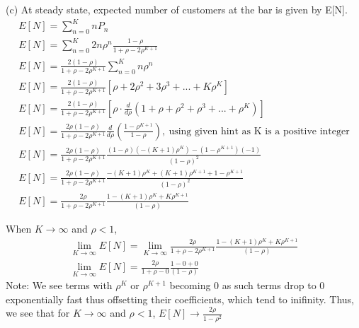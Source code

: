(c) At steady state, expected number of customers at the bar is given by E[N].
\begin{gather*}
E[N] = \sum_{n=0}^{K}nP_n\\
E[N] = \sum_{n=0}^{K}2n\rho^n\frac{1-\rho}{1+\rho - 2\rho^{K+1}}\\
E[N] = \frac{2(1-\rho)}{1+\rho - 2\rho^{K+1}}\sum_{n=0}^{K}n\rho^n\\
E[N] = \frac{2(1-\rho)}{1+\rho - 2\rho^{K+1}}[\rho + 2\rho^2 + 3\rho^3 + ... + K\rho^K]\\
E[N] = \frac{2(1-\rho)}{1+\rho - 2\rho^{K+1}}[\rho \cdot \frac{d}{d\rho} (1 + \rho + \rho^2 + \rho^3 + ... + \rho^K)]\\
E[N] = \frac{2\rho(1-\rho)}{1+\rho - 2\rho^{K+1}}\frac{d}{d\rho} (\frac{1 - \rho^{K+1}}{1 - \rho}), \ \text{using given hint as K is a positive integer} \\
E[N] = \frac{2\rho(1-\rho)}{1+\rho - 2\rho^{K+1}}\frac{(1-\rho)(-(K+1)\rho^K) - (1 - \rho^{K+1})(-1)}{(1-\rho)^2}\\
E[N] = \frac{2\rho(1-\rho)}{1+\rho - 2\rho^{K+1}}\frac{-(K+1)\rho^K + (K+1)\rho^{K+1}+1 - \rho^{K+1}}{(1-\rho)^2}\\
E[N] = \frac{2\rho}{1+\rho - 2\rho^{K+1}}\frac{1 - (K+1)\rho^K + K\rho^{K+1}}{(1-\rho)}
\end{gather*}

When $K\to\infty$ and $\rho < 1$,
\begin{gather*}
\lim_{K\to\infty}E[N] = \lim_{K\to\infty} \frac{2\rho}{1+\rho - 2\rho^{K+1}}\frac{1 - (K+1)\rho^K + K\rho^{K+1}}{(1-\rho)}\\
\lim_{K\to\infty}E[N] = \frac{2\rho}{1+\rho - 0}\frac{1 - 0 + 0}{(1-\rho)}
\end{gather*}
Note: We see terms with $\rho^{K}$ or $\rho^{K+1}$ becoming 0 as such terms drop to 0 exponentially fast thus offsetting their coefficients, which tend to inifinity. Thus, we see that for $K\to\infty$ and $\rho<1$, $E[N]\to\frac{2\rho}{1-\rho^2}$


